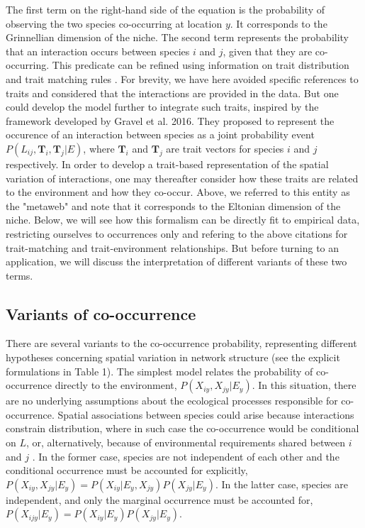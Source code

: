 \documentclass[12pt]{article}
\begin{document}
The first term on the right-hand side of the equation is the probability of
observing the two species co-occurring at location $y$. It corresponds to the
Grinnellian dimension of the niche. The second term represents the probability
that an interaction occurs between species $i$ and $j$, given that they are
co-occurring. This predicate can be refined using information on trait
distribution and trait matching rules . For brevity, we have here avoided
specific references to traits and considered that the interactions are
provided in the data. But one could develop the model further to integrate
such traits, inspired by the framework developed by Gravel et al. 2016. They
proposed to represent the occurence of an interaction between species as a
joint probability event $P(L_{ij}, \mathbf{T}_i, \mathbf{T}_j|E)$, where
$\mathbf{T}_i$ and $\mathbf{T}_j$ are trait vectors for species $i$ and $j$
respectively. In order to develop a trait-based representation of the spatial
variation of interactions, one may thereafter consider how these traits are
related to the environment and how they co-occur. Above, we referred to this
entity as the "metaweb" and note that it corresponds to the Eltonian dimension
of the niche. Below, we will see how this formalism can be directly fit to
empirical data, restricting ourselves to occurrences only and refering to the
above citations for trait-matching and trait-environment relationships. But
before turning to an application, we will discuss the interpretation of
different variants of these two terms.

\subsection*{Variants of co-occurrence}

There are several variants to the co-occurrence probability, representing
different hypotheses concerning spatial variation in network structure (see
the explicit formulations in Table 1). The simplest model relates the
probability of co-occurrence directly to the environment,
$P(X_{iy},X_{jy}|E_y)$. In this situation, there are no underlying assumptions
about the ecological processes responsible for co-occurrence. Spatial associations between species could arise
because interactions constrain distribution, where in such case the co-occurrence would be conditional on $L$, or, alternatively, because of
environmental requirements shared between $i$ and $j$ \citep{Pollock2014,
Cazelles2016}. In the former case, species are not independent of each other
and the conditional occurrence must be accounted for explicitly,
$P(X_{iy},X_{jy} |E_y)=P(X_{iy}|E_y,X_{jy})P(X_{jy}|E_y)$. In the latter case,
species are independent, and only the marginal occurrence must be accounted
for, $P( X_{ijy}|E_y)=P(X_{iy} |E_y)P(X_{jy} |E_y)$.
\end{document}
